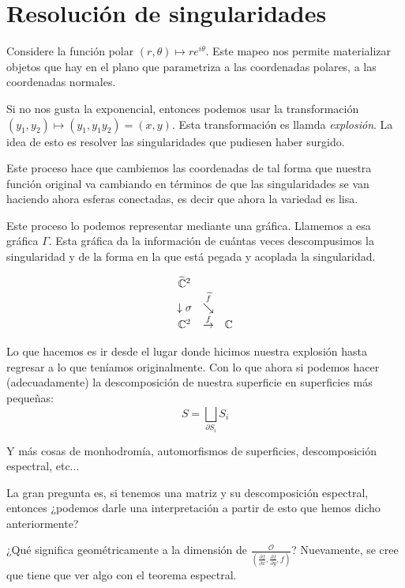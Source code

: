 \documentclass[12pt]{report}
\newcounter{it}
\theoremstyle{largebreak}
\begin{document}
    \section{Resolución de singularidades}

    Considere la función polar $(r,\theta)\mapsto re^{i\theta}$. Este mapeo nos permite materializar objetos que hay en el plano que parametriza a las coordenadas polares, a las coordenadas normales.

    Si no nos gusta la exponencial, entonces podemos usar la transformación $(y_1,y_2)\mapsto(y_1,y_1y_2)=(x,y)$. Esta transformación es llamda \textit{explosión}. La idea de esto es resolver las singularidades que pudiesen haber surgido.

    Este proceso hace que cambiemos las coordenadas de tal forma que nuestra función original va cambiando en términos de que las singularidades se van haciendo ahora esferas conectadas, es decir que ahora la variedad es lisa.

    Este proceso lo podemos representar mediante una gráfica. Llamemos a esa gráfica $\Gamma$. Esta gráfica da la información de cuántas veces descompusimos la singularidad y de la forma en la que está pegada y acoplada la singularidad.

    \begin{equation*}
        \begin{array}{ c c c }
            \widetilde{\mathbb{C}}^2 & & \\
            \downarrow\sigma & \overset{\widetilde{f}}{\searrow} & \\
            \mathbb{C}^2 & \overset{f}{\rightarrow} & \mathbb{C} \\ 
        \end{array}
    \end{equation*}

    Lo que hacemos es ir desde el lugar donde hicimos nuestra explosión hasta regresar a lo que teníamos originalmente. Con lo que ahora si podemos hacer (adecuadamente) la descomposición de nuestra superficie en superficies más pequeñas:
    \begin{equation*}
        S=\bigsqcup_{ \partial S_i}S_i
    \end{equation*}

    Y más cosas de monhodromía, automorfismos de superficies, descomposición espectral, etc...

    La gran pregunta es, si tenemos una matriz y su descomposición espectral, entonces ¿podemos darle una interpretación a partir de esto que hemos dicho anteriormente?

    ¿Qué significa geométricamente a la dimensión de $\frac{\mathcal{O}}{\left(\frac{\partial f}{\partial x},\frac{\partial f}{\partial y},f \right)}$? Nuevamente, se cree que tiene que ver algo con el teorema espectral.
\end{document}

